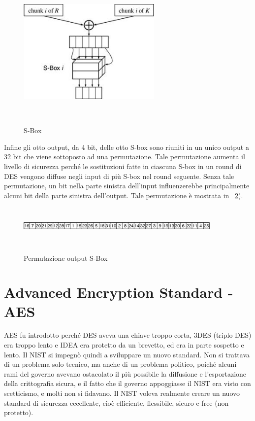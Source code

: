 \begin{figure}[htbp]
	\centering%
	\subfigure%
	{\includegraphics[height=7cm, width=7cm, keepaspectratio]{Immagini/Capitolo2/sbox.png}}
	\caption{S-Box \label{fig:sbox}} 	
\end{figure}
Infine gli otto output, da 4 bit, delle otto S-box sono riuniti in un unico output a 32 bit che viene sottoposto ad una permutazione. Tale permutazione aumenta il livello di sicurezza perché le sostituzioni fatte in ciascuna S-box in un round di DES vengono diffuse negli input di più S-box nel round seguente. Senza tale permutazione, un bit nella parte sinistra dell'input influenzerebbe principalmente alcuni bit della parte sinistra dell'output. Tale permutazione è mostrata in \figurename ~\ref{fig:sbox_perm}).
\begin{figure}[htbp]
	\centering%
	\subfigure%
	{\includegraphics[height=2cm, width=10cm, keepaspectratio]{Immagini/Capitolo2/sbox_perm.png}}
	\caption{Permutazione output S-Box \label{fig:sbox_perm}} 	
\end{figure}
	
\section{Advanced Encryption Standard - AES}
AES fu introdotto perché DES aveva una chiave troppo corta, 3DES (triplo DES) era troppo lento e IDEA era protetto da un brevetto, ed era in parte sospetto e lento. Il NIST si impegnò quindi a sviluppare un nuovo standard. Non si trattava di un problema solo tecnico, ma anche di un problema politico, poiché alcuni rami del governo avevano ostacolato il più possibile la diffusione e l'esportazione della crittografia sicura, e il fatto che il governo appoggiasse il NIST era visto con scetticismo, e molti non si fidavano. Il NIST voleva realmente creare un nuovo standard di sicurezza eccellente, cioè efficiente, flessibile, sicuro e free (non protetto). \newline


